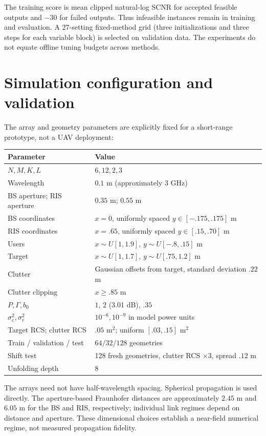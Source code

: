 \documentclass[11pt,a4paper]{article}
\begin{document}
The training score is mean clipped natural-log SCNR for accepted feasible outputs and $-30$ for failed outputs. Thus infeasible instances remain in training and evaluation. A 27-setting fixed-method grid (three initializations and three steps for each variable block) is selected on validation data. The experiments do not equate offline tuning budgets across methods.

\section{Simulation configuration and validation}
The array and geometry parameters are explicitly fixed for a short-range prototype, not a UAV deployment:
\begin{center}\small
\begin{tabular}{ll}\toprule
Parameter & Value\\\midrule
$N,M,K,L$ & $6,12,2,3$\\
Wavelength & $0.1$ m (approximately 3 GHz)\\
BS aperture; RIS aperture & $0.35$ m; $0.55$ m\\
BS coordinates & $x=0$, uniformly spaced $y\in[-.175,.175]$ m\\
RIS coordinates & $x=.65$, uniformly spaced $y\in[.15,.70]$ m\\
Users & $x\sim U[1,1.9]$, $y\sim U[-.8,.15]$ m\\
Target & $x\sim U[1,1.7]$, $y\sim U[.75,1.2]$ m\\
Clutter & Gaussian offsets from target, standard deviation $.22$ m\\
Clutter clipping & $x\geq .85$ m\\
$P,\Gamma,b_0$ & $1$, $2$ (3.01 dB), $.35$\\
$\sigma_c^2,\sigma_r^2$ & $10^{-6},10^{-9}$ in model power units\\
Target RCS; clutter RCS & $.05$ m$^2$; uniform $[.03,.15]$ m$^2$\\
Train / validation / test & $64/32/128$ geometries\\
Shift test & 128 fresh geometries, clutter RCS $\times3$, spread $.12$ m\\
Unfolding depth & 8\\\bottomrule
\end{tabular}
\end{center}
The arrays need not have half-wavelength spacing. Spherical propagation is used directly. The aperture-based Fraunhofer distances are approximately $2.45$ m and $6.05$ m for the BS and RIS, respectively; individual link regimes depend on distance and aperture. These dimensional choices establish a near-field numerical regime, not measured propagation fidelity.
\end{document}
